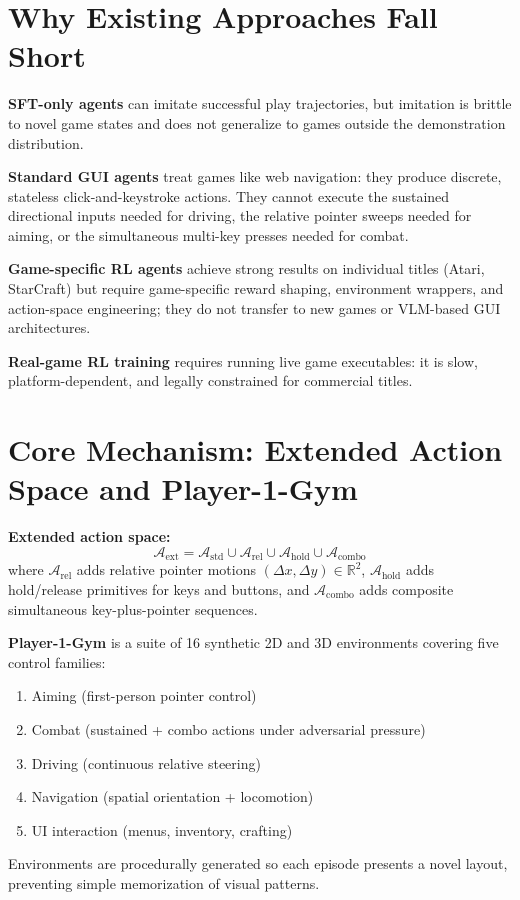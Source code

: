 \documentclass[10pt,twocolumn]{article}
\begin{document}
\section{Why Existing Approaches Fall Short}

\textbf{SFT-only agents} can imitate successful play trajectories, but imitation
is brittle to novel game states and does not generalize to games outside the
demonstration distribution.

\textbf{Standard GUI agents} treat games like web navigation: they produce
discrete, stateless click-and-keystroke actions. They cannot execute the
sustained directional inputs needed for driving, the relative pointer sweeps
needed for aiming, or the simultaneous multi-key presses needed for combat.

\textbf{Game-specific RL agents} achieve strong results on individual titles
(Atari, StarCraft) but require game-specific reward shaping, environment
wrappers, and action-space engineering; they do not transfer to new games or
VLM-based GUI architectures.

\textbf{Real-game RL training} requires running live game executables: it is
slow, platform-dependent, and legally constrained for commercial titles.

\section{Core Mechanism: Extended Action Space and Player-1-Gym}

\textbf{Extended action space:}
\[
  \mathcal{A}_{\mathrm{ext}} =
  \mathcal{A}_{\mathrm{std}} \cup
  \mathcal{A}_{\mathrm{rel}} \cup
  \mathcal{A}_{\mathrm{hold}} \cup
  \mathcal{A}_{\mathrm{combo}}
\]
where $\mathcal{A}_{\mathrm{rel}}$ adds relative pointer motions
$(\Delta x, \Delta y) \in \mathbb{R}^2$, $\mathcal{A}_{\mathrm{hold}}$ adds
hold/release primitives for keys and buttons, and $\mathcal{A}_{\mathrm{combo}}$
adds composite simultaneous key-plus-pointer sequences.

\textbf{Player-1-Gym} is a suite of 16 synthetic 2D and 3D environments
covering five control families:
\begin{enumerate}[itemsep=2pt,parsep=0pt]
  \item Aiming (first-person pointer control)
  \item Combat (sustained + combo actions under adversarial pressure)
  \item Driving (continuous relative steering)
  \item Navigation (spatial orientation + locomotion)
  \item UI interaction (menus, inventory, crafting)
\end{enumerate}
Environments are procedurally generated so each episode presents a novel layout,
preventing simple memorization of visual patterns.
\end{document}
